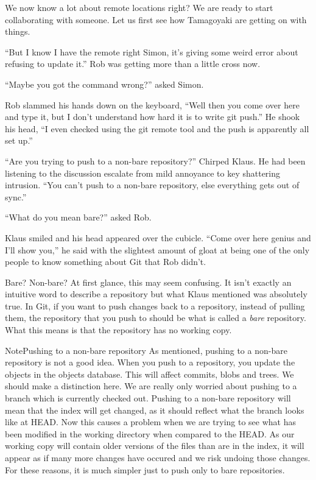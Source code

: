 We now know a lot about remote locations right?  We are ready to start collaborating with someone.  Let us first see how Tamagoyaki are getting on with things.

\begin{trenches}
``But I know I have the remote right Simon, it's giving some weird error about refusing to update it.''  Rob was getting more than a little cross now.  

``Maybe you got the command wrong?'' asked Simon.

Rob slammed his hands down on the keyboard, ``Well then you come over here and type it, but I don't understand how hard it is to write git push.''  He shook his head, ``I even checked using the git remote tool and the push is apparently all set up.''

``Are you trying to push to a non-bare repository?'' Chirped Klaus.  He had been listening to the discussion escalate from mild annoyance to key shattering intrusion.  ``You can't push to a non-bare repository, else everything gets out of sync.''

``What do you mean bare?'' asked Rob.

Klaus smiled and his head appeared over the cubicle.  ``Come over here genius and I'll show you,'' he said with the slightest amount of gloat at being one of the only people to know something about Git that Rob didn't.
\end{trenches}

Bare?  Non-bare?  At first glance, this may seem confusing.  It isn't exactly an intuitive word to describe a repository but what Klaus mentioned was absolutely true.  In Git, if you want to push changes back to a repository, instead of pulling them, the repository that you push to should be what is called a \emph{bare} repository.  What this means is that the repository has no working copy.

\begin{callout}{Note}{Pushing to a non-bare repository}
As mentioned, pushing to a non-bare repository is not a good idea.  When you push to a repository, you update the objects in the objects database.  This will affect commits, blobs and trees.  We should make a distinction here.  We are really only worried about pushing to a branch which is currently checked out.  Pushing to a non-bare repository will mean that the index will get changed, as it should reflect what the branch looks like at HEAD.  
\newline
\newline
Now this causes a problem when we are trying to see what has been modified in the working directory when compared to the HEAD.  As our working copy will contain older versions of the files than are in the index, it will appear as if many more changes have occured and we risk undoing those changes.  For these reasons, it is much simpler just to push only to bare repositories.
\end{callout}

